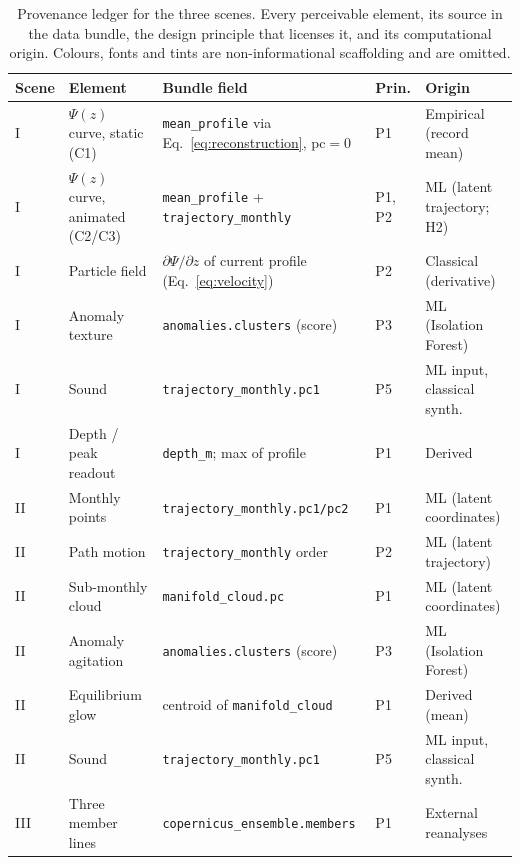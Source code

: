 \begin{table}[tbp]
\centering
\caption[Provenance ledger]{Provenance ledger for the three scenes. Every
perceivable element, its source in the data bundle, the design principle that
licenses it, and its computational origin. Colours, fonts and tints are
non-informational scaffolding and are omitted.}
\label{tab:ledger}
\footnotesize
\renewcommand{\arraystretch}{1.3}
\begin{tabularx}{\textwidth}{@{}p{1.2cm} X p{3.4cm} p{1.1cm} X@{}}
\toprule
\textbf{Scene} & \textbf{Element} & \textbf{Bundle field} & \textbf{Prin.} &
\textbf{Origin} \\
\midrule
I   & $\Psi(z)$ curve, static (C1) & \texttt{mean\_profile} via Eq.~\ref{eq:reconstruction}, $\mathrm{pc}=0$ & P1 & Empirical (record mean) \\
I   & $\Psi(z)$ curve, animated (C2/C3) & \texttt{mean\_profile} + \texttt{trajectory\_monthly} & P1, P2 & ML (latent trajectory; H2) \\
I   & Particle field & $\partial\Psi/\partial z$ of current profile (Eq.~\ref{eq:velocity}) & P2 & Classical (derivative) \\
I   & Anomaly texture & \texttt{anomalies.clusters} (score) & P3 & ML (Isolation Forest) \\
I   & Sound & \texttt{trajectory\_monthly.pc1} & P5 & ML input, classical synth. \\
I   & Depth / peak readout & \texttt{depth\_m}; max of profile & P1 & Derived \\
\addlinespace
II  & Monthly points & \texttt{trajectory\_monthly.pc1/pc2} & P1 & ML (latent coordinates) \\
II  & Path motion & \texttt{trajectory\_monthly} order & P2 & ML (latent trajectory) \\
II  & Sub-monthly cloud & \texttt{manifold\_cloud.pc} & P1 & ML (latent coordinates) \\
II  & Anomaly agitation & \texttt{anomalies.clusters} (score) & P3 & ML (Isolation Forest) \\
II  & Equilibrium glow & centroid of \texttt{manifold\_cloud} & P1 & Derived (mean) \\
II  & Sound & \texttt{trajectory\_monthly.pc1} & P5 & ML input, classical synth. \\
\addlinespace
III & Three member lines & \texttt{copernicus\_ensemble.members} & P1 & External reanalyses \\

\end{tabularx}
\end{table}
